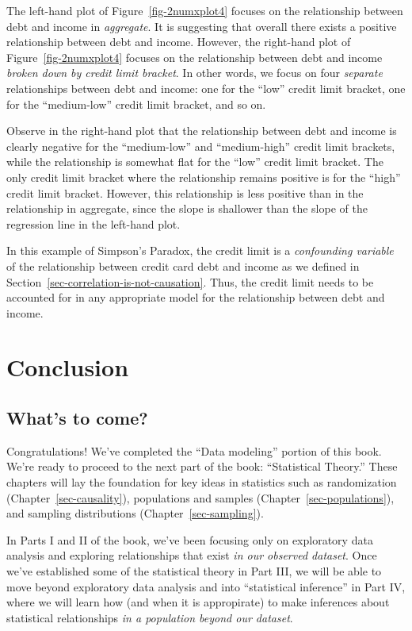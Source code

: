 \documentclass[
  letterpaper,
  DIV=11,
  numbers=noendperiod]{scrreprt}
\theoremstyle{definition}
\theoremstyle{remark}
\begin{document}
The left-hand plot of Figure~\ref{fig-2numxplot4} focuses on the
relationship between debt and income in \emph{aggregate}. It is
suggesting that overall there exists a positive relationship between
debt and income. However, the right-hand plot of
Figure~\ref{fig-2numxplot4} focuses on the relationship between debt and
income \emph{broken down by credit limit bracket}. In other words, we
focus on four \emph{separate} relationships between debt and income: one
for the ``low'' credit limit bracket, one for the ``medium-low'' credit
limit bracket, and so on.

Observe in the right-hand plot that the relationship between debt and
income is clearly negative for the ``medium-low'' and ``medium-high''
credit limit brackets, while the relationship is somewhat flat for the
``low'' credit limit bracket. The only credit limit bracket where the
relationship remains positive is for the ``high'' credit limit bracket.
However, this relationship is less positive than in the relationship in
aggregate, since the slope is shallower than the slope of the regression
line in the left-hand plot.

In this example of Simpson's Paradox, the credit limit is a
\emph{confounding variable} of the relationship between credit card debt
and income as we defined in
Section~\ref{sec-correlation-is-not-causation}. Thus, the credit limit
needs to be accounted for in any appropriate model for the relationship
between debt and income.

\hypertarget{sec-multi-reg-conclusion}{%
\section{Conclusion}\label{sec-multi-reg-conclusion}}

\hypertarget{whats-to-come-3}{%
\subsection{What's to come?}\label{whats-to-come-3}}

Congratulations! We've completed the ``Data modeling'' portion of this
book. We're ready to proceed to the next part of the book: ``Statistical
Theory.'' These chapters will lay the foundation for key ideas in
statistics such as randomization (Chapter~\ref{sec-causality}),
populations and samples (Chapter~\ref{sec-populations}), and sampling
distributions (Chapter~\ref{sec-sampling}).

In Parts I and II of the book, we've been focusing only on exploratory
data analysis and exploring relationships that exist \emph{in our
observed dataset}. Once we've established some of the statistical theory
in Part III, we will be able to move beyond exploratory data analysis
and into ``statistical inference'' in Part IV, where we will learn how
(and when it is appropirate) to make inferences about statistical
relationships \emph{in a population beyond our dataset}.
\end{document}
